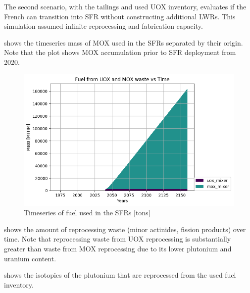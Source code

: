 		The second scenario, with the tailings and used \gls{UOX}
		inventory, evaluates if the French can transition into \gls{SFR}
		without constructing additional \gls{LWR}s. This simulation
		assumed infinite reprocessing and fabrication capacity.
		
		 shows the timeseries mass of \gls{MOX} used in the 
		\gls{SFR}s separated by their origin.
		Note that the plot shows \gls{MOX}
		accumulation prior to \gls{SFR} deployment from 2020.
		
		\begin{figure}[htbp!]
			\begin{center}
				\includegraphics[width=\columnwidth]{./images/french-transition/where_fuel.png}
			\end{center}
			\caption{Timeseries of fuel used in the \gls{SFR}s [tons]}
			\label{fig:fuel}
		\end{figure}
		
		 shows the amount of reprocessing waste
		(minor actinides, fission products) over time. Note that 
		reprocessing waste from \gls{UOX} reprocessing is substantially
		greater than waste from \gls{MOX} reprocessing due to its lower
		plutonium and uranium content.
		
		 shows the isotopics of the plutonium that are
		reprocessed from the used fuel inventory.
		
